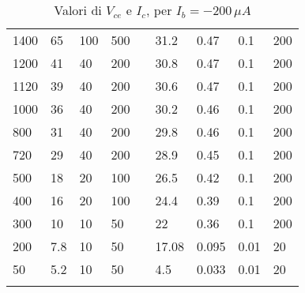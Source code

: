 \begin{longtable}[c]{|l|l|l|l|l|l|l|l|l|}
    1400          & 65                        & 100                       & 500                       &  & 31.2       & 0.47                      & 0.1                       & 200                       \\ \cline{1-4} \cline{6-9}
    1200          & 41                        & 40                        & 200                       &  & 30.8       & 0.47                      & 0.1                       & 200                       \\ \cline{1-4} \cline{6-9}
    1120          & 39                        & 40                        & 200                       &  & 30.6       & 0.47                      & 0.1                       & 200                       \\ \cline{1-4} \cline{6-9}
    1000          & 36                        & 40                        & 200                       &  & 30.2       & 0.46                      & 0.1                       & 200                       \\ \cline{1-4} \cline{6-9}
    800           & 31                        & 40                        & 200                       &  & 29.8       & 0.46                      & 0.1                       & 200                       \\ \cline{1-4} \cline{6-9}
    720           & 29                        & 40                        & 200                       &  & 28.9       & 0.45                      & 0.1                       & 200                       \\ \cline{1-4} \cline{6-9}
    500           & 18                        & 20                        & 100                       &  & 26.5       & 0.42                      & 0.1                       & 200                       \\ \cline{1-4} \cline{6-9}
    400           & 16                        & 20                        & 100                       &  & 24.4       & 0.39                      & 0.1                       & 200                       \\ \cline{1-4} \cline{6-9}
    300           & 10                        & 10                        & 50                        &  & 22         & 0.36                      & 0.1                       & 200                       \\ \cline{1-4} \cline{6-9}
    200           & 7.8                       & 10                        & 50                        &  & 17.08      & 0.095                     & 0.01                      & 20                        \\ \cline{1-4} \cline{6-9}
    50            & 5.2                       & 10                        & 50                        &  & 4.5        & 0.033                    & 0.01                      & 20                        \\ \cline{1-4} \cline{6-9}
    \caption{\label{tab:Tabella1}{Valori di $V_{ce}$ e $I_c$, per $I_b=-200\,\mu A$}}                                                                                                                        \\
\end{longtable}

